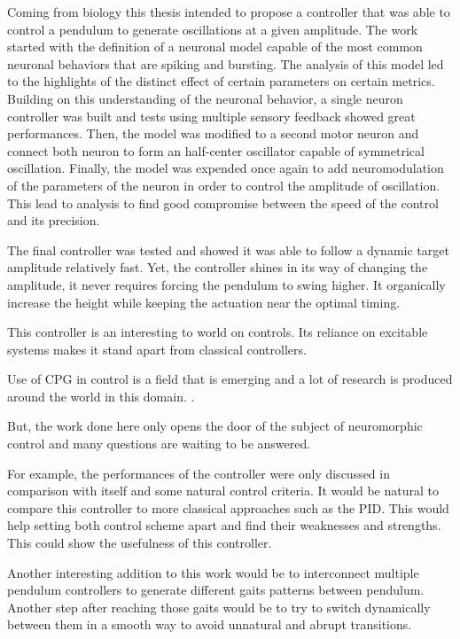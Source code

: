Coming from biology this thesis intended to propose a controller that was able to control a pendulum to generate oscillations at a given amplitude. 
The work started with the definition of a neuronal model capable of the most common neuronal behaviors that are spiking and bursting.
The analysis of this model led to the highlights of the distinct effect of certain parameters on certain metrics.
Building on this understanding of the neuronal behavior, a single neuron controller was built and tests using multiple sensory feedback showed great performances.
Then, the model was modified to a second motor neuron and connect both neuron to form an half-center oscillator capable of symmetrical oscillation.
Finally, the model was expended once again to add neuromodulation of the parameters of the neuron in order to control the amplitude of oscillation. 
This lead to analysis to find good compromise between the speed of the control and its precision. 

The final controller was tested and showed it was able to follow a dynamic target amplitude relatively fast. 
Yet, the controller shines in its way of changing the amplitude, it never requires forcing the pendulum to swing higher.
It organically increase the height while keeping the actuation near the optimal timing.

This controller is an interesting to world on controls. 
Its reliance on excitable systems makes it stand apart from classical controllers.

Use of CPG in control is a field that is emerging and a lot of research is produced around the world in this domain. \citep{related1,related2,related3,related4,related5}.

But, the work done here only opens the door of the subject of neuromorphic control and many questions are waiting to be answered. 

For example, the performances of the controller were only discussed in comparison with itself and some natural control criteria. 
It would be natural to compare this controller to more classical approaches such as the PID. 
This would help setting both control scheme apart and find their weaknesses and strengths.
This could show the usefulness of this controller.

Another interesting addition to this work would be to interconnect multiple pendulum controllers to generate different gaits patterns between pendulum. 
Another step after reaching those gaits would be to try to switch dynamically between them in a smooth way to avoid unnatural and abrupt transitions.

